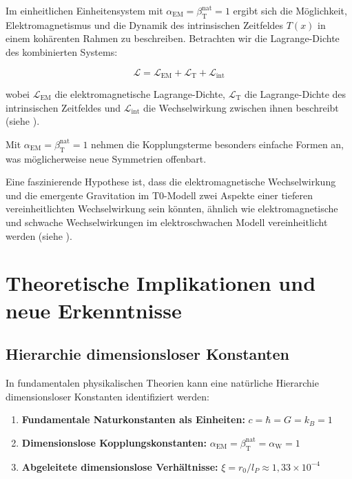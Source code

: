 \documentclass[12pt,a4paper]{article}
\newcommand{\Tfield}{T(x)}
\newcommand{\alphaEM}{\alpha_{\text{EM}}}
\newcommand{\betaT}{\beta_{\text{T}}}
\newcommand{\alphaW}{\alpha_{\text{W}}}
\begin{document}
	Im einheitlichen Einheitensystem mit \(\alphaEM = \betaT^{\text{nat}} = 1\) ergibt sich die Möglichkeit, Elektromagnetismus und die Dynamik des intrinsischen Zeitfeldes \(\Tfield\) in einem kohärenten Rahmen zu beschreiben. Betrachten wir die Lagrange-Dichte des kombinierten Systems:
	
	\begin{equation}
		\mathcal{L} = \mathcal{L}_{\text{EM}} + \mathcal{L}_{\text{T}} + \mathcal{L}_{\text{int}}
	\end{equation}
	
	wobei \(\mathcal{L}_{\text{EM}}\) die elektromagnetische Lagrange-Dichte, \(\mathcal{L}_{\text{T}}\) die Lagrange-Dichte des intrinsischen Zeitfeldes und \(\mathcal{L}_{\text{int}}\) die Wechselwirkung zwischen ihnen beschreibt (siehe \cite{pascher_lagrange_2025}).
	
	Mit \(\alphaEM = \betaT^{\text{nat}} = 1\) nehmen die Kopplungsterme besonders einfache Formen an, was möglicherweise neue Symmetrien offenbart.
	
	Eine faszinierende Hypothese ist, dass die elektromagnetische Wechselwirkung und die emergente Gravitation im T0-Modell zwei Aspekte einer tieferen vereinheitlichten Wechselwirkung sein könnten, ähnlich wie elektromagnetische und schwache Wechselwirkungen im elektroschwachen Modell vereinheitlicht werden (siehe \cite{pascher_emergente_gravitation_2025}).
	
	\section{Theoretische Implikationen und neue Erkenntnisse}
	\label{sec:implications}
	
	\subsection{Hierarchie dimensionsloser Konstanten}
	\label{subsec:hierarchy}
	
	In fundamentalen physikalischen Theorien kann eine natürliche Hierarchie dimensionsloser Konstanten identifiziert werden:
	
	\begin{enumerate}[label=\arabic*.]
		\item \textbf{Fundamentale Naturkonstanten als Einheiten:} \(c = \hbar = G = k_B = 1\)
		\item \textbf{Dimensionslose Kopplungskonstanten:} \(\alphaEM = \betaT^{\text{nat}} = \alphaW = 1\)
		\item \textbf{Abgeleitete dimensionslose Verhältnisse:} \(\xi = r_0/l_P \approx 1,33 \times 10^{-4}\)
	\end{enumerate}
	
\end{document}
